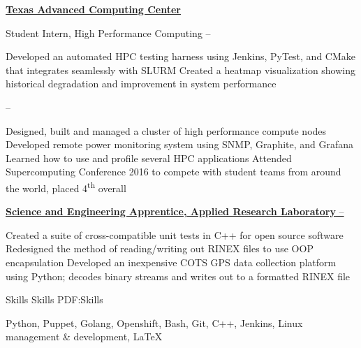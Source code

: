 \documentclass[letterpaper,MMMyyyy,nonstopmode]{simpleresumecv}
\begin{document}
\begin{Body}
\BigGap

\Entry
\href{http://tacc.utexas.edu}
{\textbf{Texas Advanced Computing Center}}

\Gap
\BulletItem
Student Intern, High Performance Computing
\hfill
{} --
\begin{Detail}
\SubBulletItem
Developed an automated HPC testing harness using Jenkins, PyTest, and \newline
  CMake that integrates seamlessly with SLURM
\SubBulletItem
Created a heatmap visualization showing historical degradation \newline
  and improvement in system performance
\end{Detail}
\hfill
{} --
\begin{Detail}
\SubBulletItem
Designed, built and managed a cluster of high performance compute nodes
\SubBulletItem
Developed remote power monitoring system using SNMP, Graphite, \newline and
  Grafana
\SubBulletItem
Learned how to use and profile several HPC applications
\SubBulletItem
Attended Supercomputing Conference 2016 to compete with student teams \newline
  from around the world, placed 4\textsuperscript{th} overall
\end{Detail}

\BigGap

\Entry
\href{http://arlut.utexas.edu}
{\textbf{Science and Engineering Apprentice, Applied Research Laboratory}
  \hfill
   --
  }
\begin{Detail}
\BulletItem
Created a suite of cross-compatible unit tests in C++ for open source software
\BulletItem
Redesigned the method of reading/writing out RINEX files to use OOP \newline
  encapsulation
\BulletItem
Developed an inexpensive COTS GPS data collection platform using \newline
  Python; decodes binary streams and writes out to a formatted RINEX file
\end{Detail}



\Section
{Skills}
{Skills}
{PDF:Skills}

\Entry
Python, 
Puppet,
Golang,
Openshift,
Bash,
Git, 
C++, 
Jenkins,
Linux management \& development, 
\LaTeX



\end{Body}
\end{document}
